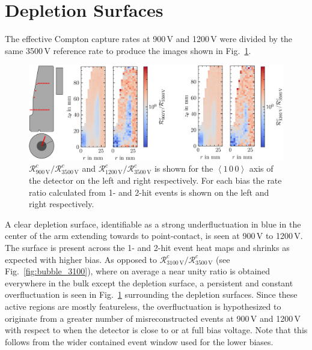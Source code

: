 \section{Depletion Surfaces}

The effective Compton capture rates at 900\,V and 1200\,V were divided by the same 3500\,V reference rate to produce the images shown in Fig.~\ref{fig:bubbles}.
\begin{figure}[htb]
    \centering
    \includegraphics[width=6in]{figs/bubbles/bubbles.png}
    \caption{$\mathcal{R}^c_{900\,\text{V}}/\mathcal{R}^c_{3500\,\text{V}}$ and $\mathcal{R}^c_{1200\,\text{V}}/\mathcal{R}^c_{3500\,\text{V}}$ is shown for the $\left<1\,0\,0\right>$ axis of the detector on the left and right respectively. For each bias the rate ratio calculated from 1- and 2-hit events is shown on the left and right respectively.}
	\label{fig:bubbles}
\end{figure}

A clear depletion surface, identifiable as a strong underfluctuation in blue in the center of the arm extending towards to point-contact, is seen at 900\,V to 1200\,V. The surface is present across the 1- and 2-hit event heat maps and shrinks as expected with higher bias. As opposed to $\mathcal{R}^c_{3100\,\text{V}}/\mathcal{R}^c_{3500\,\text{V}}$ (see Fig.~\ref{fig:bubble_3100}), where on average a near unity ratio is obtained everywhere in the bulk except the depletion surface, a persistent and constant overfluctuation is seen in Fig.~\ref{fig:bubbles} surrounding the depletion surfaces. Since these active regions are mostly featureless, the overfluctuation is hypothesized to originate from a greater number of misreconstructed events at 900\,V and 1200\,V with respect to when the detector is close to or at full bias voltage. Note that this follows from the wider contained event window used for the lower biases.

